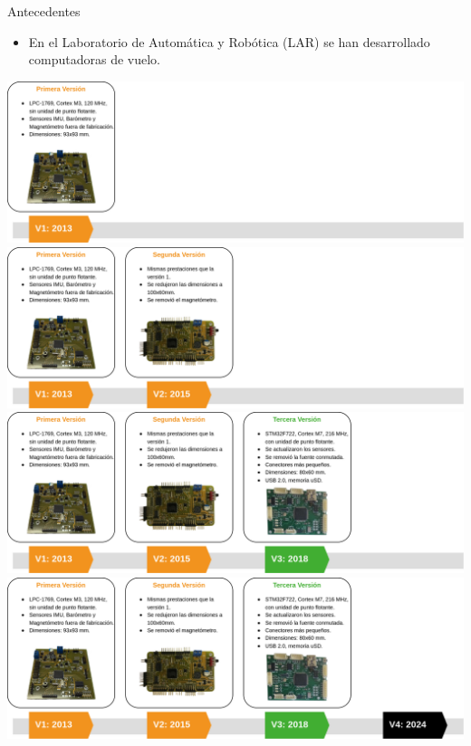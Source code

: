 \begin{frame}{Antecedentes}
	\begin{itemize}
		\item <1->En el Laboratorio de Automática y Robótica (LAR) se han desarrollado computadoras de vuelo.
	\end{itemize}
	\begin{center}
		\begin{overprint}
			\includegraphics[width=\textwidth]{img/antecedentes_1.png}
			\onslide<3>\includegraphics[width=\textwidth]{img/antecedentes_2.png}
			\onslide<4>\includegraphics[width=\textwidth]{img/antecedentes_3.png}
			\onslide<5>\includegraphics[width=\textwidth]{img/antecedentes_4.png}
		\end{overprint}
	\end{center}
\end{frame}

